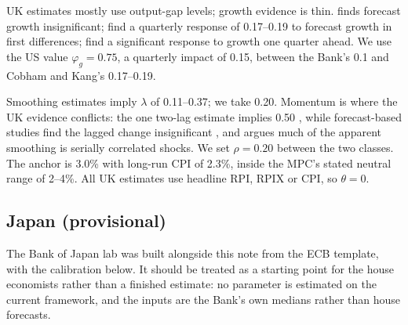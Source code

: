 \documentclass[11pt,a4paper]{article}
\begin{document}
UK estimates mostly use output-gap levels; growth evidence is thin. \textcite{goodhart2005} finds forecast growth insignificant; \textcite{cobhamkang2013} find a quarterly response of 0.17--0.19 to forecast growth in first differences; \textcite{cloyne2016} find a significant response to growth one quarter ahead. We use the US value $\varphi_g=0.75$, a quarterly impact of 0.15, between the Bank's 0.1 and Cobham and Kang's 0.17--0.19.

Smoothing estimates imply $\lambda$ of 0.11--0.37; we take 0.20. Momentum is where the UK evidence conflicts: the one two-lag estimate implies 0.50 \parencite{boinetmartin2008}, while forecast-based studies find the lagged change insignificant \parencite{goodhart2005,cobhamkang2013,cloyne2016}, and \textcite{cobham2003} argues much of the apparent smoothing is serially correlated shocks. We set $\rho=0.20$ between the two classes. The anchor is 3.0\% with long-run CPI of 2.3\%, inside the MPC's stated neutral range of 2--4\%. All UK estimates use headline RPI, RPIX or CPI, so $\theta=0$.

\subsection{Japan (provisional)}
\label{sec:japan}

The Bank of Japan lab was built alongside this note from the ECB template, with the calibration below. It should be treated as a starting point for the house economists rather than a finished estimate: no parameter is estimated on the current framework, and the inputs are the Bank's own medians rather than house forecasts.
\end{document}
